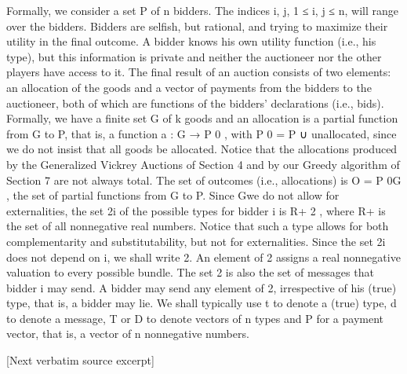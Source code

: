 \documentclass[10pt]{article}
\begin{document}
\begin{ReviewVerbatim}
Formally, we consider a set P of n bidders. The indices i, j, 1 ≤ i, j ≤ n, will
range over the bidders. Bidders are selfish, but rational, and trying to maximize their
utility in the final outcome. A bidder knows his own utility function (i.e., his type),
but this information is private and neither the auctioneer nor the other players have
access to it. The final result of an auction consists of two elements: an allocation
of the goods and a vector of payments from the bidders to the auctioneer, both of
which are functions of the bidders’ declarations (i.e., bids). Formally, we have a
finite set G of k goods and an allocation is a partial function from G to P, that is, a
function a : G → P 0 , with P 0 = P ∪ {unallocated}, since we do not insist that all
goods be allocated. Notice that the allocations produced by the Generalized Vickrey
Auctions of Section 4 and by our Greedy algorithm of Section 7 are not always
total. The set of outcomes (i.e., allocations) is O = P 0G , the set of partial functions
from G to P. Since Gwe do not allow for externalities, the set 2i of the possible types
for bidder i is R+ 2 , where R+ is the set of all nonnegative real numbers. Notice
that such a type allows for both complementarity and substitutability, but not for
externalities. Since the set 2i does not depend on i, we shall write 2. An element
of 2 assigns a real nonnegative valuation to every possible bundle. The set 2 is
also the set of messages that bidder i may send. A bidder may send any element of
2, irrespective of his (true) type, that is, a bidder may lie. We shall typically use t
to denote a (true) type, d to denote a message, T or D to denote vectors of n types
and P for a payment vector, that is, a vector of n nonnegative numbers.

[Next verbatim source excerpt]


\end{ReviewVerbatim}
\end{document}
